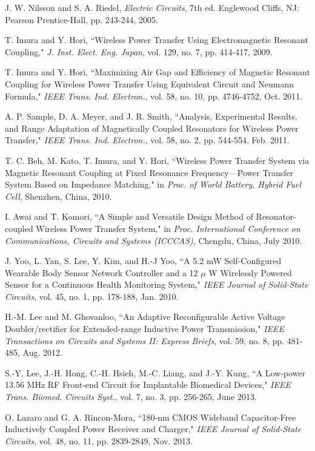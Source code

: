 \documentclass[twocolumn,10pt]{IEEEtran}
\begin{document}
\begin{thebibliography}{99}
J. W. Nilsson and S. A. Riedel, \emph{Electric Circuits}, 7th ed. Englewood Cliffs, NJ: Pearson Prentice-Hall, pp. 243-244, 2005.

T. Imura and Y. Hori, ``Wireless Power Transfer Using Electromagnetic Resonant Coupling," \emph{J. Inst. Elect. Eng. Japan}, vol. 129, no. 7,  pp. 414-417, 2009.

T. Imura and Y. Hori, ``Maximizing Air Gap and Efficiency of Magnetic Resonant Coupling for Wireless Power Transfer Using Equivalent Circuit and Neumann Formula," \emph{IEEE Trans. Ind. Electron.}, vol. 58, no. 10, pp. 4746-4752, Oct. 2011.


A. P. Sample, D. A. Meyer, and J. R. Smith, ``Analysis, Experimental
Results, and Range Adaptation of Magnetically Coupled Resonators for
Wireless Power Transfer," \emph{IEEE Trans. Ind. Electron.}, vol. 58, no. 2,
pp. 544-554, Feb. 2011.

T. C. Beh, M. Kato, T. Imura, and Y. Hori, ``Wireless Power
Transfer System via Magnetic Resonant Coupling at Fixed Resonance
Frequency—Power Transfer System Based on Impedance Matching," in
\emph{Proc. of World Battery, Hybrid Fuel Cell}, Shenzhen, China,
2010.

I. Awai and T. Komori, ``A Simple and Versatile Design Method of
Resonator-coupled Wireless Power Transfer System," in \emph{Proc. International Conference on Communications, Circuits and Systems (ICCCAS)}, Chengdu, China, July 2010.

J. Yoo, L. Yan, S. Lee, Y. Kim, and H.-J Yoo, ``A 5.2 mW Self-Configured Wearable Body Sensor Network Controller and a 12 $\mu$ W Wirelessly Powered Sensor for a Continuous Health Monitoring System," \emph{IEEE Journal of  Solid-State Circuits}, vol. 45, no. 1,  pp. 178-188,  Jan.
2010.

H.-M. Lee and M. Ghovanloo, ``An Adaptive Reconfigurable Active Voltage Doubler/rectifier for Extended-range Inductive Power Transmission," \emph{IEEE Transactions on Circuits and Systems II: Express Briefs}, vol. 59, no. 8, pp. 481-485, Aug. 2012.

S.-Y. Lee, J.-H. Hong, C.-H. Hsieh, M.-C. Liang, and J.-Y. Kung, ``A Low-power 13.56 MHz RF Front-end Circuit for Implantable  Biomedical Devices," \emph{IEEE Trans. Biomed. Circuits Syst.}, vol. 7, no. 3, pp. 256-265, June 2013.

O. Lazaro and G. A. Rincon-Mora, ``180-nm CMOS Wideband Capacitor-Free Inductively Coupled Power Receiver and Charger," \emph{IEEE Journal of 
Solid-State Circuits}, vol.	48, no. 11, pp. 2839-2849, Nov. 2013.
 

\end{thebibliography}
\end{document}
